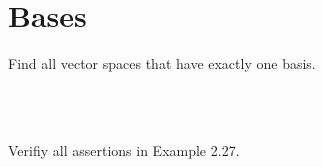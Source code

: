 \section{Bases}

\begin{exercise}
    Find all vector spaces that have exactly one basis. \\
\end{exercise}

\begin{solution}
    \\ \td \\
\end{solution}

\begin{exercise}
    Verifiy all assertions in Example 2.27. \\
\end{exercise}

\begin{solution}
    \\ \td \\
\end{solution}